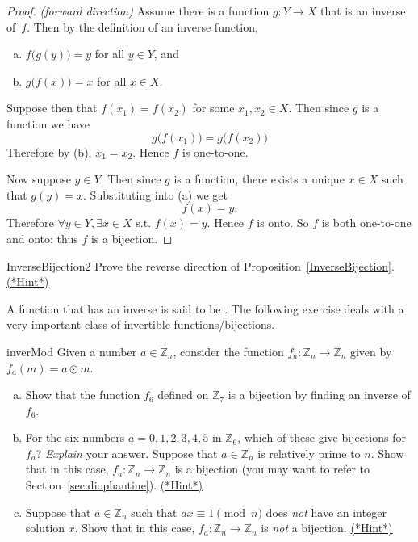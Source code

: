  
 \begin{proof} \emph{(forward direction)}
 Assume there is a function $g \colon Y \to X$ that is an inverse of~$f$. Then by the definition of an inverse function,
\begin{enumerate}[(a)]
\item $f \bigl( g(y) \bigr) = y$ for all $y \in Y$, and
\item $g \bigl( f(x) \bigr) = x$ for all $x \in X$.
\end{enumerate}
Suppose then that $f(x_1) = f(x_2)$ for some $x_1, x_2 \in X$.  Then since $g$ is a function we have
$$g \bigl( f(x_1) \bigr) = g \bigl( f(x_2) \bigr)$$
Therefore by (b), $x_1 = x_2$. Hence $f$ is one-to-one.

\noindent
Now suppose $y \in Y$.  Then since $g$ is a function, there exists a unique  $x \in X$ such that $g(y) = x$.  Substituting into (a) we get
\[f (x) = y.\]
Therefore $\forall y \in Y, \exists x \in X \mbox{ s.t. } f(x) = y$.  Hence $f$ is onto.
So $f$ is both one-to-one and onto: thus $f$ is a bijection.
 \end{proof}

\begin{exercise}{InverseBijection2}
Prove the reverse direction of Proposition~\ref{InverseBijection}.
\hyperref[sec:functions:hints]{(*Hint*)} 
\end{exercise}


A function that has an inverse is said to be . The following exercise deals with a very important class of invertible functions/bijections.

\begin{exercise}{inverMod}
Given a number $a \in \mathbb{Z}_n$, consider the function $f_a: \mathbb{Z}_n \rightarrow \mathbb{Z}_n$ given by $f_a(m) = a \odot m$.
\begin{enumerate}[(a)]
\item
Show that the function $f_6$ defined on $\mathbb{Z}_7$ is a bijection by finding an inverse of $f_6$.
 \item 
For the six numbers $a=0,1,2,3,4,5$ in $\mathbb{Z}_6$, which of these give bijections for $f_a$? \emph{Explain} your answer.
Suppose that $a \in  \mathbb{Z}_n$ is relatively prime to $n$. Show that in this case, $f_a:\mathbb{Z}_n \rightarrow \mathbb{Z}_n$ is a bijection (you may want to refer to Section~\ref{sec:diophantine}).
\hyperref[sec:functions:hints]{(*Hint*)}
\item
Suppose that $a \in  \mathbb{Z}_n$ such that $ax \equiv 1 \pmod{n}$ does \emph{not} have an integer solution $x$. Show that in this case, $f_a:\mathbb{Z}_n \rightarrow \mathbb{Z}_n$ is \emph{not} a bijection.
\hyperref[sec:functions:hints]{(*Hint*)}
\end{enumerate}
\end{exercise}  

